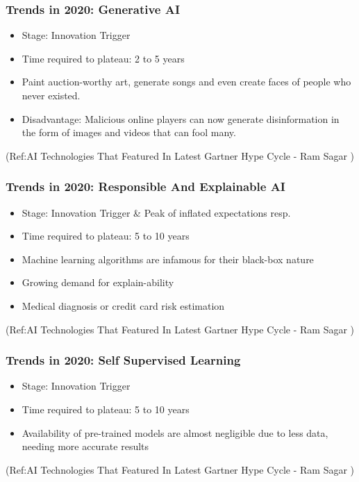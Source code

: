 \begin{frame}[fragile]\frametitle{Trends in 2020: Generative AI}
\begin{itemize}
\item Stage: Innovation Trigger
\item Time required to plateau: 2 to 5 years
\item Paint auction-worthy art, generate songs and even create faces of people who never existed. 
\item Disadvantage: Malicious online players can now generate disinformation in the form of images and videos that can fool many. 
\end{itemize}


{\tiny (Ref:AI Technologies That Featured In Latest Gartner Hype Cycle - 
Ram Sagar )}

\end{frame}

\begin{frame}[fragile]\frametitle{Trends in 2020: Responsible And Explainable AI}
\begin{itemize}
\item Stage: Innovation Trigger \& Peak of inflated expectations resp.
\item Time required to plateau: 5 to 10 years
\item Machine learning algorithms are infamous for their black-box nature
\item Growing demand for explain-ability
\item Medical diagnosis or credit card risk estimation
\end{itemize}


{\tiny (Ref:AI Technologies That Featured In Latest Gartner Hype Cycle - 
Ram Sagar )}

\end{frame}

\begin{frame}[fragile]\frametitle{Trends in 2020: Self Supervised Learning}
\begin{itemize}
\item Stage: Innovation Trigger
\item Time required to plateau: 5 to 10 years
\item Availability of pre-trained models are almost negligible due to less data, needing more accurate results
\end{itemize}


{\tiny (Ref:AI Technologies That Featured In Latest Gartner Hype Cycle - 
Ram Sagar )}

\end{frame}



